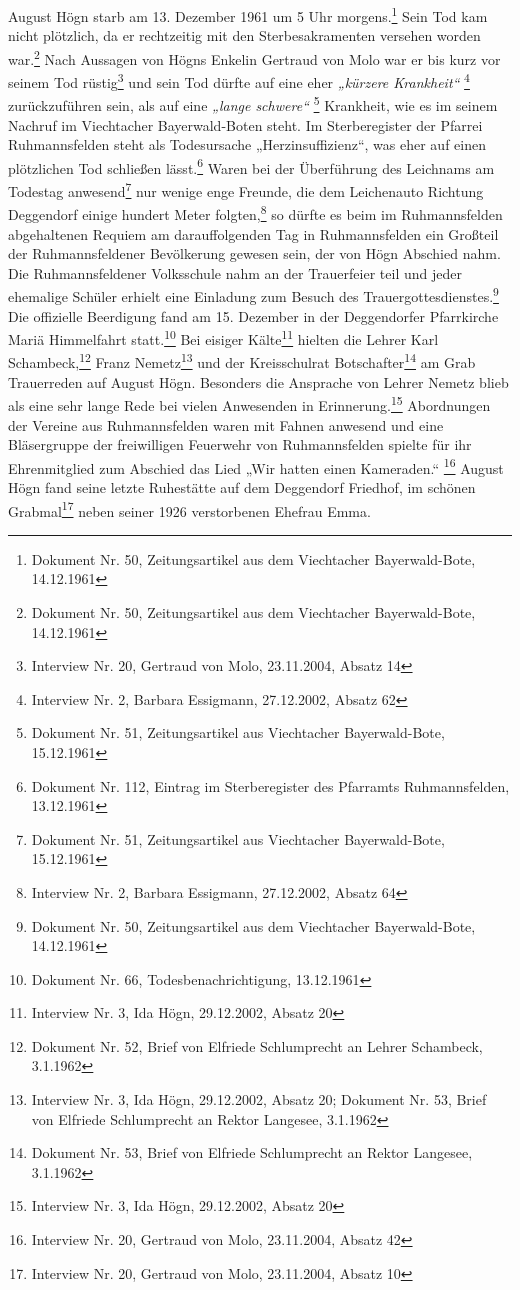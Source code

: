 \documentclass[a4paper]{article}
\newcommand\textstyleZitate[1]{\textit{#1}}
\begin{document}
August Högn starb am 13. Dezember 1961 um 5 Uhr morgens.\footnote{
Dokument Nr. 50, Zeitungsartikel aus dem Viechtacher Bayerwald-Bote,
14.12.1961} Sein Tod kam nicht plötzlich, da er rechtzeitig mit den
Sterbesakramenten versehen worden war.\footnote{ Dokument Nr. 50,
Zeitungsartikel aus dem Viechtacher Bayerwald-Bote, 14.12.1961} Nach
Aussagen von Högns Enkelin Gertraud von Molo war er bis kurz vor seinem
Tod rüstig\footnote{ Interview Nr. 20, Gertraud von Molo, 23.11.2004,
Absatz 14} und sein Tod dürfte auf eine eher \textstyleZitate{„kürzere
Krankheit“ }\footnote{ Interview Nr. 2, Barbara Essigmann, 27.12.2002,
Absatz 62} zurückzuführen sein, als auf eine \textstyleZitate{„lange
schwere“} \footnote{ Dokument Nr. 51, Zeitungsartikel aus Viechtacher
Bayerwald-Bote, 15.12.1961} Krankheit, wie es im seinem Nachruf im
Viechtacher Bayerwald-Boten steht. Im Sterberegister der Pfarrei
Ruhmannsfelden steht als Todesursache „Herzinsuffizienz“, was eher auf
einen plötzlichen Tod schließen lässt.\footnote{ Dokument Nr. 112,
Eintrag im Sterberegister des Pfarramts Ruhmannsfelden, 13.12.1961}
Waren bei der Überführung des Leichnams am Todestag anwesend\footnote{
Dokument Nr. 51, Zeitungsartikel aus Viechtacher Bayerwald-Bote,
15.12.1961} nur wenige enge Freunde, die dem Leichenauto Richtung
Deggendorf einige hundert Meter folgten,\footnote{ Interview Nr. 2,
Barbara Essigmann, 27.12.2002, Absatz 64} so dürfte es beim im
Ruhmannsfelden abgehaltenen Requiem am darauffolgenden Tag in
Ruhmannsfelden ein Großteil der Ruhmannsfeldener Bevölkerung gewesen
sein, der von Högn Abschied nahm. Die Ruhmannsfeldener Volksschule nahm
an der Trauerfeier teil und jeder ehemalige Schüler erhielt eine
Einladung zum Besuch des Trauergottesdienstes.\footnote{ Dokument Nr.
50, Zeitungsartikel aus dem Viechtacher Bayerwald-Bote, 14.12.1961} Die
offizielle Beerdigung fand am 15. Dezember in der Deggendorfer
Pfarrkirche Mariä Himmelfahrt statt.\footnote{ Dokument Nr. 66,
Todesbenachrichtigung, 13.12.1961} Bei eisiger Kälte\footnote{
Interview Nr. 3, Ida Högn, 29.12.2002, Absatz 20} hielten die Lehrer
Karl Schambeck,\footnote{ Dokument Nr. 52, Brief von Elfriede
Schlumprecht an Lehrer Schambeck, 3.1.1962} Franz Nemetz\footnote{
Interview Nr. 3, Ida Högn, 29.12.2002, Absatz 20; Dokument Nr. 53,
Brief von Elfriede Schlumprecht an Rektor Langesee, 3.1.1962} und der
Kreisschulrat Botschafter\footnote{ Dokument Nr. 53, Brief von Elfriede
Schlumprecht an Rektor Langesee, 3.1.1962} am Grab Trauerreden auf
August Högn. Besonders die Ansprache von Lehrer Nemetz blieb als eine
sehr lange Rede bei vielen Anwesenden in Erinnerung.\footnote{
Interview Nr. 3, Ida Högn, 29.12.2002, Absatz 20} Abordnungen der
Vereine aus Ruhmannsfelden waren mit Fahnen anwesend und eine
Bläsergruppe der freiwilligen Feuerwehr von Ruhmannsfelden spielte für
ihr Ehrenmitglied zum Abschied das Lied „Wir hatten einen Kameraden.“
\footnote{ Interview Nr. 20, Gertraud von Molo, 23.11.2004, Absatz 42}
August Högn fand seine letzte Ruhestätte auf dem Deggendorf Friedhof,
im schönen Grabmal\footnote{ Interview Nr. 20, Gertraud von Molo,
23.11.2004, Absatz 10} neben seiner 1926 verstorbenen Ehefrau Emma.
\end{document}
